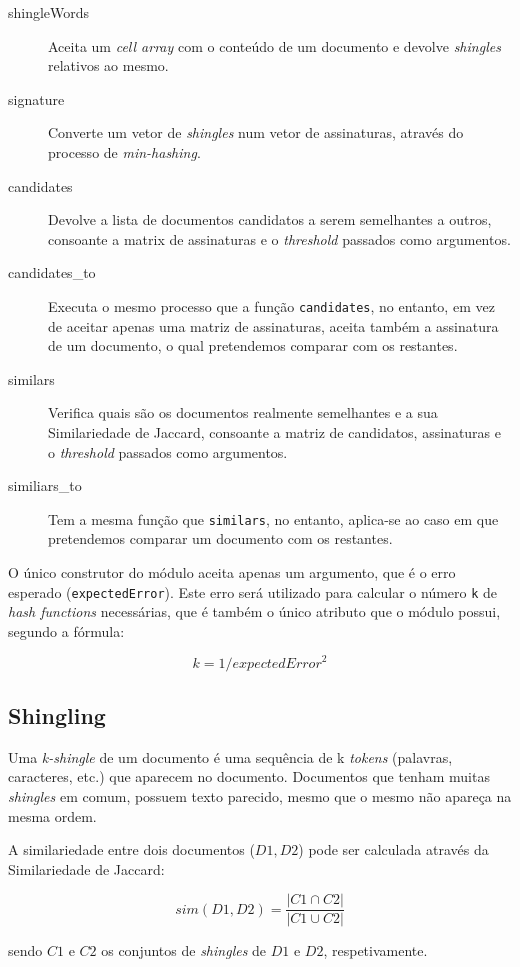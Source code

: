 \documentclass[a4paper,11pt,openright,oneside]{report}
\begin{document}
\begin{description}
\item[shingleWords]
Aceita um \textit{cell array} com o conteúdo de um documento e devolve \textit{shingles} relativos ao mesmo.
\item[signature]
Converte um vetor de \textit{shingles} num vetor de assinaturas, através do processo de \textit{min-hashing}.
\item[candidates]
Devolve a lista de documentos candidatos a serem semelhantes a outros, consoante a matrix de assinaturas e o \textit{threshold} passados como argumentos.
\item[candidates\_to]
Executa o mesmo processo que a função \texttt{candidates}, no entanto, em vez de aceitar apenas uma matriz de assinaturas, aceita também a assinatura de um documento, o qual pretendemos comparar com os restantes.
\item[similars]
Verifica quais são os documentos realmente semelhantes e a sua Similariedade de Jaccard, consoante a matriz de candidatos, assinaturas e o \textit{threshold} passados como argumentos.
\item[similiars\_to]
Tem a mesma função que \texttt{similars}, no entanto, aplica-se ao caso em que pretendemos comparar um documento com os restantes.
\end{description}

O único construtor do módulo aceita apenas um argumento, que é o erro esperado (\texttt{expectedError}). Este erro será utilizado para calcular o número \texttt{k} de \textit{hash functions} necessárias, que é também o único atributo que o módulo possui, segundo a fórmula:

$$ k = 1 / expectedError^2 $$

\subsection{Shingling}
\label{subsec.shingling}

Uma \textit{k-shingle} de um documento é uma sequência de k \textit{tokens} (palavras, caracteres, etc.) que aparecem no documento. Documentos que tenham muitas \textit{shingles} em comum, possuem texto parecido, mesmo que o mesmo não apareça na mesma ordem.

A similariedade entre dois documentos ($D1, D2$) pode ser calculada através da Similariedade de Jaccard:

$$ sim(D1, D2) = \frac{|C1\cap C2|}{|C1\cup C2|} $$

sendo $C1$ e $C2$ os conjuntos de \textit{shingles} de $D1$ e $D2$, respetivamente.
\end{document}

